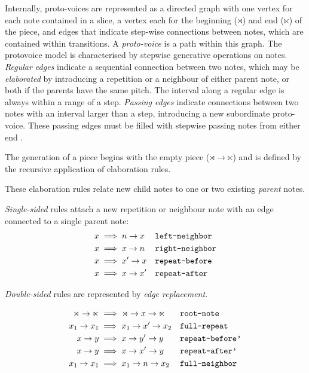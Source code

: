 \documentclass[12pt,a4paper,twoside,openany]{report} \usepackage[pdfborder={0 0 0}]{hyperref}    %
\theoremstyle{definition} \newtheorem{definition}{Definition}[section]
\begin{document}
Internally, proto-voices are represented as a directed graph with one vertex for each note contained in a slice,
a vertex each for the beginning ($\rtimes$) and end ($\ltimes$) of the piece, and edges that indicate step-wise
connections between notes, which are contained within transitions. 
A \textit{proto-voice} is a path within this graph. The protovoice model is characterised by stepwise generative operations on notes. 
\textit{Regular edges} indicate a sequential connection between two notes, which may be \textit{elaborated} by introducing a repetition or a neighbour of either parent note, or both if the parents have the same pitch. 
The interval along a regular edge is always within a range of a step.
\textit{Passing edges} indicate connections between two notes with an interval larger than a step, introducing a new subordinate proto-voice. 
These passing edges must be filled with stepwise passing notes from either end \cite{finkensiepModelingInferringProtovoice2021}.

The generation of a piece begins with the empty piece ($\rtimes \to \ltimes$) and is defined by the recursive
application of elaboration rules.

These elaboration rules relate new child notes to one or two existing \textit{parent} notes.

\textit{Single-sided} rules attach a new repetition or neighbour note with an edge connected to a single parent note: 
\begin{equation}
  \begin{aligned} 
    x &\implies n \to x && \text{\texttt{left-neighbor}} \\ 
    x &\implies x \to n && \text{\texttt{right-neighbor}} \\ 
    x &\implies x' \to x && \text{\texttt{repeat-before}} \\ 
    x &\implies x \to x' && \text{\texttt{repeat-after}} \\ 
  \end{aligned}
\end{equation}

\textit{Double-sided} rules are represented by \textit{edge replacement}. 

\begin{equation} 
  \begin{aligned}
    \rtimes \to \ltimes &\implies \rtimes \to x \to \ltimes && \text{\texttt{root-note}} \\ 
    x_1 \to x_1 &\implies x_1 \to x' \to x_2 && \text{\texttt{full-repeat}} \\
    x \to y &\implies x \to y' \to y && \text{\texttt{repeat-before'}} \\
    x \to y &\implies x \to x' \to y && \text{\texttt{repeat-after'}} \\ 
    x_1 \to x_1 &\implies x_1 \to n \to x_2 && \text{\texttt{full-neighbor}} \\
\end{aligned} 
\label{eq:doublesidedinnerop} \end{equation}
\end{document}
